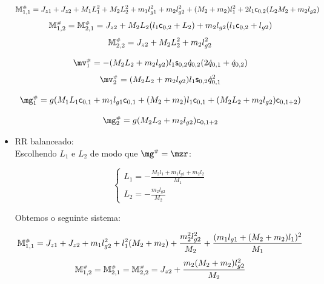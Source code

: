\begin{itemize}
\begin{equation}
	\mathbb{M}^{\scriptscriptstyle \#}_{1,1} = J_{z1} + J_{z2} + M_1 L_1^2 + M_2 L_2^2 + m_1 l_{g1}^2 + m_2 l_{g2}^2 + (M_2 + m_2)l_1^2 + 2 l_1 \mathsf{c}_{0,2} (L_2 M_2 + m_2 l_{g2})
\end{equation}
\begin{equation}
	\mathbb{M}^{\scriptscriptstyle \#}_{1,2} = \mathbb{M}^{\scriptscriptstyle \#}_{2,1} = J_{z2} + M_2 L_2 (l_1 \mathsf{c}_{0,2} + L_2) + m_2 l_{g2} (l_1 \mathsf{c}_{0,2} + l_{g2})
\end{equation}
\begin{equation}
	\mathbb{M}^{\scriptscriptstyle \#}_{2,2} = J_{z2} + M_2 L_2^2 + m_2 l_{g2}^2
\end{equation}

\begin{equation}
	\mv\ssh_1 = - (M_2 L_2 + m_2 l_{g2}) l_1 \ssin_{0,2} \dot{q}_{0,2} (2 \dot{q}_{0,1} + \dot{q}_{0,2})  
\end{equation}
\begin{equation}
	\mv\ssh_2 = (M_2 L_2 + m_2 l_{g2}) l_1 \ssin_{0,2} \dot{q}_{0,1}^2  
\end{equation}

\begin{equation}
	\mg\ssh_1 = g( M_1 L_1 \ccos_{0,1} + m_1 l_{g1} \ccos_{0,1} + (M_2 + m_2) l_1 \ccos_{0,1} + (M_2 L_2 + m_2 l_{g2}) \ccos_{0,1+2} ) 
\end{equation}

\begin{equation}
	\mg\ssh_2 = g( M_2 L_2 + m_2 l_{g2} ) \ccos_{0,1+2} 
\end{equation}

\item RR balanceado: \\

Escolhendo $L_1$ e $L_2$ de modo que $\mg\ssh = \mzr$:

\begin{equation}
	\begin{cases}
	L_1 = -\frac{ M_2 l_1 + m_1 l_{g1} + m_2 l_2 }{M_1} \\
	L_2 = -\frac{ m_2 l_{g2} }{ M_2 }
	\end{cases}
\end{equation}

Obtemos o seguinte sistema:

\begin{equation}
	\mathbb{M}^{\scriptscriptstyle \#}_{1,1} = J_{z1} + J_{z2} + m_1 l_{g2}^2 + l_1^2 (M_2 + m_2) + \frac{m_2^2 l_{g2}^2}{M_2} + \frac{(m_1 l_{g1} + (M_2 + m_2) l_1 )^2 }{M_1}
\end{equation}
\begin{equation}
	\mathbb{M}^{\scriptscriptstyle \#}_{1,2} = \mathbb{M}^{\scriptscriptstyle \#}_{2,1} = \mathbb{M}^{\scriptscriptstyle \#}_{2,2} = J_{z2} + \frac{ m_2 (M_2 + m_2) l_{g2}^2}{M_2}
\end{equation}


\end{itemize}
